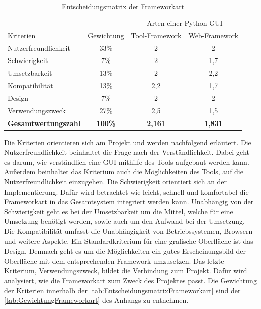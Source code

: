 \documentclass[a4paper,titlepage,halfparskip,12pt]{scrreprt}
\begin{document}
\begin{onehalfspacing}
\renewcommand{\arraystretch}{2}
\begin{table}[h]
	\centering
	\caption{Entscheidungsmatrix der Frameworkart}
	\begin{tabular}{l|c|c|c}
		& & \multicolumn{2}{c}{Arten einer Python-GUI} \\
		Kriterien & Gewichtung & Tool-Framework & Web-Framework \\
		\hline
		Nutzerfreundlichkeit & 33\% & 2 & 2 \\
		\hline
		Schwierigkeit & 7\% & 2 & 1,7  \\
		\hline
		Umsetzbarkeit & 13\% & 2 & 2,2\\
		\hline
		Kompatibilität & 13\% & 2,2 & 1,7 \\
		\hline
		Design & 7\% & 2 &  2\\
		\hline 
		Verwendungszweck & 27\% & 2,5 & 1,5 \\
		\hline
		\textbf{Gesamtwertungszahl} & \textbf{100\%} & \textbf{2,161} & \textbf{1,831} \\
	\end{tabular}
	\label{tab:EntscheidungsmatrixFrameworkart}
\end{table}

Die Kriterien orientieren sich am Projekt und werden nachfolgend erläutert. Die Nutzerfreundlichkeit beinhaltet die Frage nach der Verständlichkeit. Dabei geht es darum, wie verständlich eine GUI mithilfe des Tools aufgebaut werden kann. Außerdem beinhaltet das Kriterium auch die Möglichkeiten des Tools, auf die Nutzerfreundlichkeit einzugehen. Die Schwierigkeit orientiert sich an der Implementierung. Dafür wird betrachtet wie leicht, schnell und komfortabel die Frameworkart in das Gesamtsystem integriert werden kann. Unabhängig von der Schwierigkeit geht es bei der Umsetzbarkeit um die Mittel, welche für eine Umsetzung benötigt werden, sowie auch um den Aufwand bei der Umsetzung. Die Kompatibilität umfasst die Unabhängigkeit von Betriebssystemen, Browsern und weitere Aspekte. Ein Standardkriterium für eine grafische Oberfläche ist das Design. Demnach geht es um die Möglichkeiten ein gutes Erscheinungsbild der Oberfläche mit dem entsprechenden Framework umzusetzen. Das letzte Kriterium, Verwendungszweck, bildet die Verbindung zum Projekt. Dafür wird analysiert, wie die Frameworkart zum Zweck des Projektes passt. Die Gewichtung der Kriterien innerhalb der \autoref{tab:EntscheidungsmatrixFrameworkart} sind der \autoref{tab:GewichtungFrameworkart} des Anhangs zu entnehmen.


\end{onehalfspacing}
\end{document}
